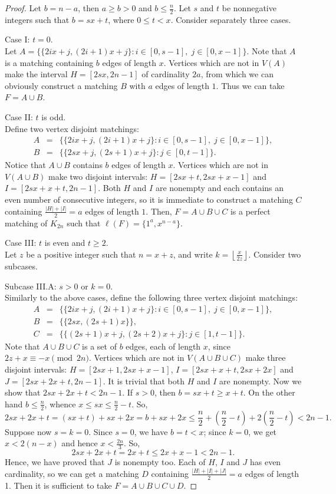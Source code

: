 \documentclass{amsart}
\theoremstyle{definition}
\numberwithin{equation}{section}
\begin{document}
\begin{proof}
Let $b=n-a$, then $a\geq b>0$ and $b\leq \frac{n}{2}$. Let $s$ and $t$ be nonnegative integers such that $b=sx+t$,
where $0\leq t< x$. Consider separately three cases.

\noindent Case I: $t=0$.\\
Let $A=\{\{2ix+j,(2i+1)x+j\}: i\in [0,s-1],\; j\in [0,x-1]\}$. Note that $A$ is a matching containing $b$ edges
of length $x$.
Vertices which are not in $V(A)$ make the interval
$H=[2sx,2n-1]$ of cardinality $2a$, from which we can obviously construct a matching $B$ with $a$ edges of length $1$.
Thus we can take $F=A\cup B$.

\noindent Case II: $t$ is odd.\\
Define two vertex disjoint matchings:
$$\begin{array}{rcl}
A &=& \{\{2ix+j,(2i+1)x+j\}: i\in [0,s-1],\; j\in [0,x-1]\},\\[2pt]
B &=& \{\{2sx+j,(2s+1)x+j\}: j\in [0,t-1]\}.
\end{array}$$
Notice that  $A\cup B$ contains $b$ edges of length $x$.
Vertices which are not in $V(A\cup B)$ make two disjoint intervals:
$H=[2sx+t,2sx+x-1]$ and $I=[2sx+x+t,2n-1]$.
Both $H$ and $I$ are nonempty and each contains an even number of consecutive integers, so it is immediate to construct
a matching $C$ containing $\frac{|H|+|I|}{2}=a$ edges of length $1$. Then, $F=A\cup B\cup C$ is a
perfect  matching of $K_{2n}$ such that $\ell(F)=\{1^a, x^{n-a}\}$.

\noindent Case III: $t$ is even and $t\geq 2$.\\
Let $z$ be a positive integer such that $n=x+z$, and write $k=\left\lfloor\frac{x}{2z}\right\rfloor$.
Consider two subcases.

\noindent Subcase III.A: $s>0$ or $k=0$.\\
Similarly to the above cases, define the following three vertex disjoint matchings:
$$\begin{array}{rcl}
A &=& \{\{2ix+j,(2i+1)x+j\}:  i\in [0,s-1],\; j\in [0,x-1]\},\\[2pt]
B &=& \{\{2sx,(2s+1)x\}\},\\[2pt]
C &=& \{\{(2s+1)x+j,(2s+2)x+j\}:  j\in [1,t-1]\}.
\end{array}$$
Note that $A\cup B\cup C$ is a set of $b$ edges, each of length $x$, since $2z+x\equiv -x\pmod{2n}$.
Vertices which are not in $V(A\cup B\cup C)$ make three disjoint intervals:
$H=[2sx+1,2sx+x-1]$, $I=[2sx+x+t,2sx+2x]$ and $J=[2sx+2x+t,2n-1]$.
It is trivial that both $H$ and $I$ are nonempty. Now we show that $2sx+2x+t<2n-1$.
If $s>0$, then $b=sx+t\geq x+t$. On the other hand $b\leq \frac{n}{2}$, whence $x\leq sx\leq \frac{n}{2}-t$.
So,
$$2sx+2x+t=(sx+t)+sx+2x=b+sx+2x\leq \frac{n}{2}+\left(\frac{n}{2}-t\right)+2\left(\frac{n}{2}-t\right)< 2n-1.$$
Suppose now $s=k=0$. Since $s=0$, we have $b=t<x$; since $k=0$, we get $x<2(n-x)$ and hence $x<\frac{2n}{3}$.
So,
$$2sx+2x+t=2x+t\leq 2x+x-1<2n-1.$$
Hence, we have proved that $J$ is nonempty too.
Each of $H$, $I$ and $J$ has even cardinality, so we can get
a matching $D$ containing $\frac{|H|+|I|+|J|}{2}=a$ edges of length 1. Then it is sufficient to take $F=A\cup B\cup C\cup D$.


\end{proof}
\end{document}

